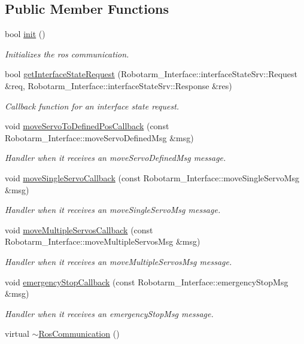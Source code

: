 \subsection*{Public Member Functions}
\begin{DoxyCompactItemize}
\item 
bool \hyperlink{class_ros_communication_a42d1d1d9e470379bcbeec795ad27315c}{init} ()
\begin{DoxyCompactList}\small\item\em Initializes the ros communication. \end{DoxyCompactList}\item 
bool \hyperlink{class_ros_communication_a820758b87bc530aeda82eddb2d0550f9}{get\+Interface\+State\+Request} (Robotarm\+\_\+\+Interface\+::interface\+State\+Srv\+::\+Request \&req, Robotarm\+\_\+\+Interface\+::interface\+State\+Srv\+::\+Response \&res)
\begin{DoxyCompactList}\small\item\em Callback function for an interface state request. \end{DoxyCompactList}\item 
void \hyperlink{class_ros_communication_aa00bb61de93c1117510fd5625035d9ab}{move\+Servo\+To\+Defined\+Pos\+Callback} (const Robotarm\+\_\+\+Interface\+::move\+Servo\+Defined\+Msg \&msg)
\begin{DoxyCompactList}\small\item\em Handler when it receives an move\+Servo\+Defined\+Msg message. \end{DoxyCompactList}\item 
void \hyperlink{class_ros_communication_a946c6140b6e83b2568d51501aff4f228}{move\+Single\+Servo\+Callback} (const Robotarm\+\_\+\+Interface\+::move\+Single\+Servo\+Msg \&msg)
\begin{DoxyCompactList}\small\item\em Handler when it receives an move\+Single\+Servo\+Msg message. \end{DoxyCompactList}\item 
void \hyperlink{class_ros_communication_a7af24efba9be306ac689849574686ab4}{move\+Multiple\+Servos\+Callback} (const Robotarm\+\_\+\+Interface\+::move\+Multiple\+Servos\+Msg \&msg)
\begin{DoxyCompactList}\small\item\em Handler when it receives an move\+Multiple\+Servos\+Msg message. \end{DoxyCompactList}\item 
void \hyperlink{class_ros_communication_ab2d6174904dad1ce1a066f1d4a6c8fd8}{emergency\+Stop\+Callback} (const Robotarm\+\_\+\+Interface\+::emergency\+Stop\+Msg \&msg)
\begin{DoxyCompactList}\small\item\em Handler when it receives an emergency\+Stop\+Msg message. \end{DoxyCompactList}\item 
virtual \hyperlink{class_ros_communication_ab65e97f16b04e4a752d48f9f991c32a1}{$\sim$\+Ros\+Communication} ()
\end{DoxyCompactItemize}
